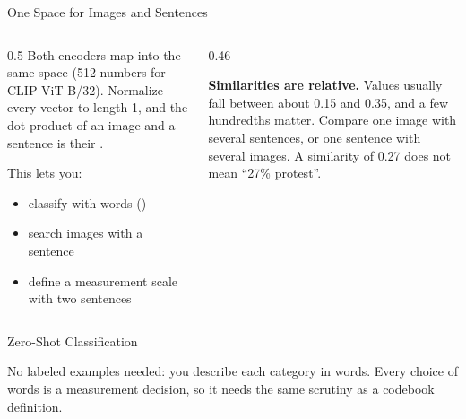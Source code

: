 \begin{frame}{One Space for Images and Sentences}
\begin{columns}[T]
\begin{column}{0.5\textwidth}
Both encoders map into the same space (512 numbers for CLIP ViT-B/32). Normalize every vector to
length 1, and the dot product of an image and a sentence is their .

\vspace{0.2cm}
This lets you:
\begin{itemize}
\item classify with words ()
\item search images with a sentence
\item define a measurement scale with two sentences
\end{itemize}
\end{column}
\begin{column}{0.46\textwidth}
\begin{warnbox}
\textbf{Similarities are relative.} Values usually fall between about 0.15 and 0.35, and a few
hundredths matter. Compare one image with several sentences, or one sentence with several images.
A similarity of 0.27 does not mean ``27\% protest''.
\end{warnbox}
\end{column}
\end{columns}
\end{frame}

\begin{frame}{Zero-Shot Classification}
\vspace{0.1cm}
\centering
{}

\vspace{0.4cm}
\raggedright
No labeled examples needed: you describe each category in words. Every choice of words is a
measurement decision, so it needs the same scrutiny as a codebook definition.
\end{frame}

